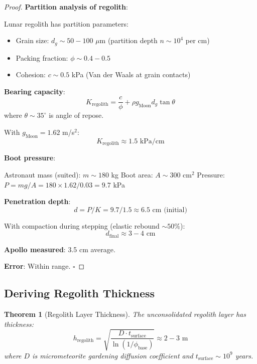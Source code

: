 \documentclass[twocolumn,10pt]{article}
\newtheorem{theorem}{Theorem}[section]
\theoremstyle{definition}
\theoremstyle{remark}
\begin{document}
\begin{proof}
\textbf{Partition analysis of regolith}:

Lunar regolith has partition parameters:
\begin{itemize}
    \item Grain size: $d_g \sim 50-100$ $\mu$m (partition depth $n \sim 10^4$ per cm)
    \item Packing fraction: $\phi \sim 0.4-0.5$
    \item Cohesion: $c \sim 0.5$ kPa (Van der Waals at grain contacts)
\end{itemize}

\textbf{Bearing capacity}:
\begin{equation}
K_{\text{regolith}} = \frac{c}{\phi} + \rho g_{\text{Moon}} d_g \tan\theta
\end{equation}
where $\theta \sim 35^\circ$ is angle of repose.

With $g_{\text{Moon}} = 1.62$ m/s$^2$:
\begin{equation}
K_{\text{regolith}} \approx 1.5 \text{ kPa/cm}
\end{equation}

\textbf{Boot pressure}:

Astronaut mass (suited): $m \sim 180$ kg
Boot area: $A \sim 300$ cm$^2$
Pressure: $P = mg/A = 180 \times 1.62 / 0.03 = 9.7$ kPa

\textbf{Penetration depth}:
\begin{equation}
d = P/K = 9.7 / 1.5 \approx 6.5 \text{ cm (initial)}
\end{equation}

With compaction during stepping (elastic rebound $\sim 50\%$):
\begin{equation}
d_{\text{final}} \approx 3-4 \text{ cm}
\end{equation}

\textbf{Apollo measured}: 3.5 cm average.

\textbf{Error}: Within range. $\square$
\end{proof}

\subsection{Deriving Regolith Thickness}

\begin{theorem}[Regolith Layer Thickness]
\label{thm:regolith}
The unconsolidated regolith layer has thickness:
\begin{equation}
h_{\text{regolith}} = \sqrt{\frac{D \cdot t_{\text{surface}}}{\ln(1/\phi_{\text{base}})}} \approx 2-3 \text{ m}
\end{equation}
where $D$ is micrometeorite gardening diffusion coefficient and $t_{\text{surface}} \sim 10^9$ years.
\end{theorem}
\end{document}
